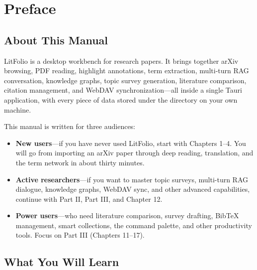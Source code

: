 \chapter*{Preface}

\section*{About This Manual}

LitFolio is a desktop workbench for research papers. It brings together
arXiv browsing, PDF reading, highlight annotations, term extraction, multi-turn RAG
conversation, knowledge graphs, topic survey generation, literature comparison,
citation management, and WebDAV synchronization---all inside a single Tauri application,
with every piece of data stored under the  directory
on your own machine.

This manual is written for three audiences:

\begin{itemize}
  \item \textbf{New users}---if you have never used LitFolio, start with Chapters 1--4.
    You will go from importing an arXiv paper through deep reading, translation, and
    the term network in about thirty minutes.
  \item \textbf{Active researchers}---if you want to master topic surveys, multi-turn
    RAG dialogue, knowledge graphs, WebDAV sync, and other advanced capabilities,
    continue with Part II, Part III, and Chapter 12.
  \item \textbf{Power users}---who need literature comparison, survey drafting, BibTeX
    management, smart collections, the command palette, and other productivity tools.
    Focus on Part III (Chapters 11--17).
\end{itemize}

\section*{What You Will Learn}

